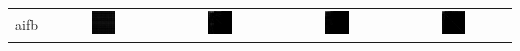 \documentclass{article}
\begin{document}
\begin{table}[h]
\begin{tabular}{l | c c c c}
\hline
aifb
&
    \includegraphics[width=0.23\textwidth]{../img/aifb/adjacency-matrix-random-ordering.png}
& 
    \includegraphics[width=0.23\textwidth]{../img/aifb/adjacency-matrix-given-ordering.png}
& 
    \includegraphics[width=0.23\textwidth]{../img/aifb/adjacency-matrix-degree-ordering.png}
& 
    \includegraphics[width=0.23\textwidth]{../img/aifb/adjacency-matrix-slashburn-ordering.png} \\


\end{tabular}
\end{table}
\end{document}
